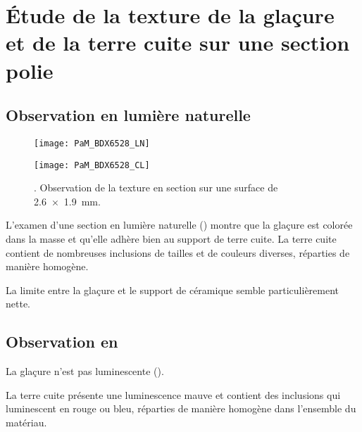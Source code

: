\section{Étude de la texture de la glaçure et de la terre cuite sur 
         une section polie}

\subsection{Observation en lumière naturelle}
\begin{figure}[p]
  \begin{minipage}[t]{0.48\textwidth}
    \centerfloat
    \texttt{[image: PaM\_BDX6528\_LN]}%
  \end{minipage}%
  \hfill%
  \begin{minipage}[t]{0.48\textwidth}
    \centerfloat
    \texttt{[image: PaM\_BDX6528\_CL]}%
    \subcaption{\CL \label{texture:6528_CL}}
  \end{minipage}
  \caption[\ -- Observation de la texture en section]
          {\legendeA.
           Observation de la texture en section 
           sur une surface de \SI{2.6x1.9}{\mm}.}
  \label{texture:6528}
\end{figure}

L'examen d'une section en lumière naturelle 
() montre que la glaçure est colorée dans 
la masse et qu'elle adhère bien au support de terre cuite. La terre 
cuite contient de nombreuses inclusions de tailles et de couleurs 
diverses, réparties de manière homogène.

La limite entre la glaçure et le support de céramique semble 
particulièrement nette.

\subsection{Observation en \CL}
La glaçure n'est pas luminescente ().

La terre cuite présente une luminescence mauve et contient des 
inclusions qui luminescent en rouge ou bleu, réparties de manière 
homogène dans l'ensemble du matériau.

